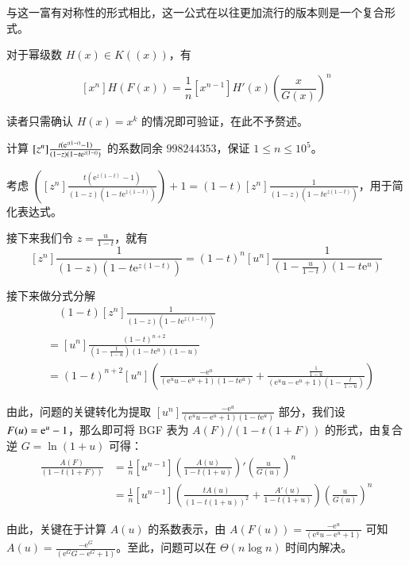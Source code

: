 与这一富有对称性的形式相比，这一公式在以往更加流行的版本则是一个复合形式。

\begin{lemma}
对于幂级数 $H(x) \in K((x))$，有

$$
[x^n]H(F(x)) = \frac 1n [x^{n-1}] H'(x) \left(\frac x{G(x)}\right)^n
$$
\end{lemma}

读者只需确认 $H(x) = x^k$ 的情况即可验证，在此不予赘述。

\begin{problem}
计算 $[z^n]\frac{t(\mathrm{e}^{z(1-t)}-1)}{(1-z)(1-t\mathrm{e}^{z(1-t)})}$ 的系数同余 $998244353$，保证 $1\le n\le 10^5$。
\end{problem}

\begin{solution} 考虑 $\left([z^n]\frac{t(\mathrm e^{z(1-t)}-1)}{(1-z) (1-t \mathrm e^{z(1-t)})}\right) + 1 = (1-t)[z^n] \frac 1{(1-z)(1-t\mathrm e^{z(1-t)})}$，用于简化表达式。

接下来我们令 $z = \frac u{1-t}$，就有
$$
[z^n]\frac 1{(1-z)(1-t\mathrm e^{z(1-t)})} = (1-t)^n[u^n] \frac1{(1-\frac u{1-t})(1-t\mathrm{e}^u)}
$$

接下来做分式分解
\begin{align*}
 &\quad (1-t)[z^n] \frac 1{(1-z)(1-t\mathrm e^{z(1-t)})}\\
 &= [u^n]\frac{(1-t)^{n+2}}{(1-\frac{t}{1-u})(1-t\mathrm e^u)(1-u)}\\
 &= (1-t)^{n+2} [u^n] \left(\frac{-\mathrm e^u}{\left(\mathrm e^u u-\mathrm e^u+1\right) \left(1-t \mathrm e^u\right)}+\frac{\frac{1}{1-u}}{\left(\mathrm e^u   u-\mathrm e^u+1\right) (1-\frac{t}{1-u})}\right)\end{align*}

由此，问题的关键转化为提取 $[u^n] \frac{-\mathrm e^u}{\left(\mathrm e^u u-\mathrm e^u+1\right) \left(1-t \mathrm e^u\right)}$ 部分，我们设 $F(u) = \mathrm{e}^u-1$，那么即可将 BGF 表为 $A(F)/(1-t(1+F))$ 的形式，由复合逆 $G=\ln(1+u)$ 可得：
\begin{align*}
[u^n] \frac{A(F)}{(1-t(1+F))}
&= \frac 1n[u^{n-1}] \left(\frac{A(u)}{1-t(1+u)}\right)' \left(\frac u{G(u)}\right)^n\\
&= \frac 1n[u^{n-1}] \left( \frac{tA(u)}{(1-t(1+u))^2} + \frac{A'(u)}{1-t(1+u)} \right) \left(\frac u{G(u)}\right)^n
\end{align*}

由此，关键在于计算 $A(u)$ 的系数表示，由 $A(F(u)) = \frac{-\mathrm e^u}{\left(\mathrm e^u u-\mathrm e^u+1\right)}$ 可知 $A(u) = \frac{-\mathrm e^G}{\left(\mathrm e^G G-\mathrm e^G+1\right)}$。至此，问题可以在 $\Theta(n\log n)$ 时间内解决。
\end{solution}

